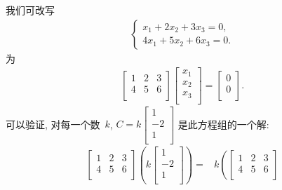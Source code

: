 \begin{example}
    我们可改写
    \begin{align*}
        \begin{cases}
            x_1 + 2x_2 + 3x_3 = 0, \\
            4x_1 + 5x_2 + 6x_3 = 0.
        \end{cases}
    \end{align*}
    为
    \begin{align*}
        \begin{bmatrix}
            1 & 2 & 3 \\
            4 & 5 & 6 \\
        \end{bmatrix}
        \begin{bmatrix}
            x_1 \\
            x_2 \\
            x_3 \\
        \end{bmatrix}
        =
        \begin{bmatrix}
            0 \\
            0 \\
        \end{bmatrix}.
    \end{align*}
    可以验证, 对每一个数~\(k\),
    \(
    C = k\begin{bmatrix}
        1  \\
        -2 \\
        1  \\
    \end{bmatrix}
    \)
    是此方程组的一个解:
    \begin{align*}
        \begin{bmatrix}
            1 & 2 & 3 \\
            4 & 5 & 6 \\
        \end{bmatrix}
        \left(
        k\begin{bmatrix}
                 1  \\
                 -2 \\
                 1  \\
             \end{bmatrix}
        \right)
        = {} &
        k
        \left(
        \begin{bmatrix}
                1 & 2 & 3 \\
                4 & 5 & 6 \\

\end{bmatrix}
\end{align*}
\end{example}

